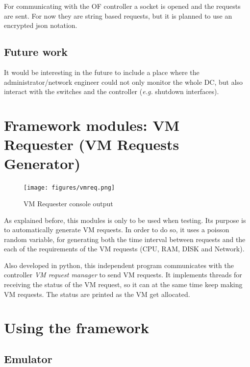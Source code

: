 \documentclass[12pt,english,oneside]{book}
\begin{document}
For communicating with the OF controller a socket is opened and the requests are sent. For now they are string based requests, but it is planned to use an encrypted json\cite{JSON} notation.

\subsection{Future work}
\hspace{0.6cm}

It would be interesting in the future to include a place where the administrator/network engineer could not only monitor the whole DC, but also interact with the switches and the controller (\textit{e.g.} shutdown interfaces).

\newpage

\section{Framework modules: VM Requester (VM Requests Generator)}
\hspace{0.6cm}

\begin{figure}[h!tbp]
        \centering
        \texttt{[image: figures/vmreq.png]}
        \caption{VM Requester console output}
        \label{fig:vmreq}
\end{figure}

As explained before, this modules is only to be used when testing. Its purpose is to automatically generate VM requests.
In order to do so, it uses a poisson random variable, for generating both the time interval between requests and the each of the requirements of the VM requests (CPU, RAM, DISK and Network).

Also developed in python, this independent program communicates with the controller \textit{VM request manager} to send VM requests.
It implements threads for receiving the status of the VM request, so it can at the same time keep making VM requests. The status are printed as the VM get allocated.

\newpage

\section{Using the framework}

\subsection{Emulator}
\end{document}
